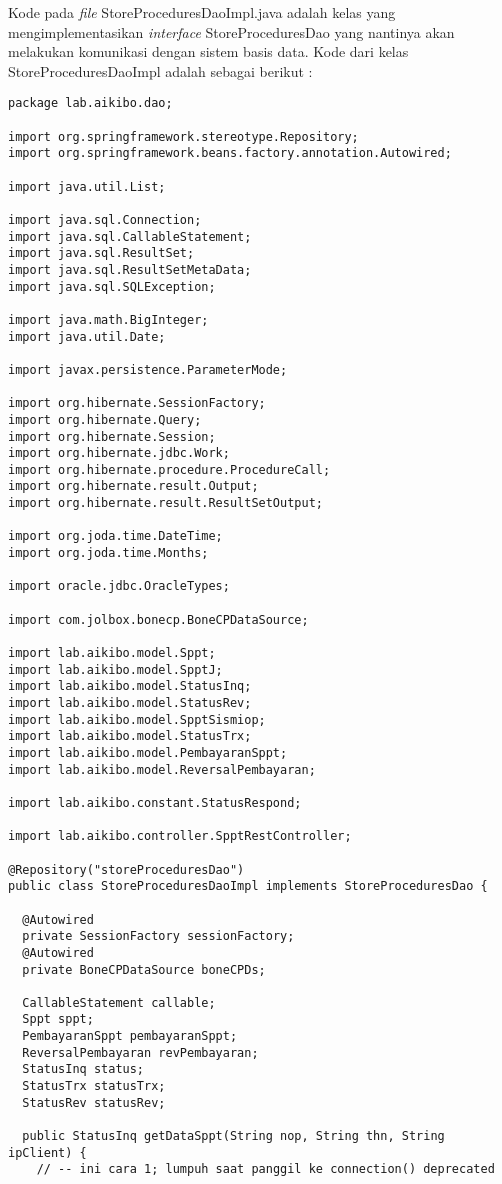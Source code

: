 \documentclass[pdftex,12pt, oneside]{article}
\begin{document}
Kode pada \textit{file} StoreProceduresDaoImpl.java adalah kelas yang mengimplementasikan \textit{interface} StoreProceduresDao yang nantinya akan melakukan komunikasi dengan sistem basis data. Kode dari kelas StoreProceduresDaoImpl adalah sebagai berikut :

\begin{lstlisting}
package lab.aikibo.dao;

import org.springframework.stereotype.Repository;
import org.springframework.beans.factory.annotation.Autowired;

import java.util.List;

import java.sql.Connection;
import java.sql.CallableStatement;
import java.sql.ResultSet;
import java.sql.ResultSetMetaData;
import java.sql.SQLException;

import java.math.BigInteger;
import java.util.Date;

import javax.persistence.ParameterMode;

import org.hibernate.SessionFactory;
import org.hibernate.Query;
import org.hibernate.Session;
import org.hibernate.jdbc.Work;
import org.hibernate.procedure.ProcedureCall;
import org.hibernate.result.Output;
import org.hibernate.result.ResultSetOutput;

import org.joda.time.DateTime;
import org.joda.time.Months;

import oracle.jdbc.OracleTypes;

import com.jolbox.bonecp.BoneCPDataSource;

import lab.aikibo.model.Sppt;
import lab.aikibo.model.SpptJ;
import lab.aikibo.model.StatusInq;
import lab.aikibo.model.StatusRev;
import lab.aikibo.model.SpptSismiop;
import lab.aikibo.model.StatusTrx;
import lab.aikibo.model.PembayaranSppt;
import lab.aikibo.model.ReversalPembayaran;

import lab.aikibo.constant.StatusRespond;

import lab.aikibo.controller.SpptRestController;

@Repository("storeProceduresDao")
public class StoreProceduresDaoImpl implements StoreProceduresDao {

  @Autowired
  private SessionFactory sessionFactory;
  @Autowired
  private BoneCPDataSource boneCPDs;

  CallableStatement callable;
  Sppt sppt;
  PembayaranSppt pembayaranSppt;
  ReversalPembayaran revPembayaran;
  StatusInq status;
  StatusTrx statusTrx;
  StatusRev statusRev;

  public StatusInq getDataSppt(String nop, String thn, String ipClient) {
    // -- ini cara 1; lumpuh saat panggil ke connection() deprecated


\end{lstlisting}
\end{document}
